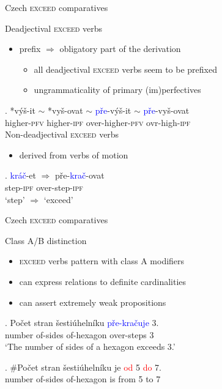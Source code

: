 \documentclass[12pt]{beamer}
\begin{document}
\begin{frame}{Czech \textsc{exceed} comparatives}

Deadjectival \textsc{exceed} verbs

\begin{itemize}
\item prefix $\Rightarrow$ obligatory part of the derivation
\begin{itemize}
\item all deadjectival \textsc{exceed} verbs seem to be prefixed
\item ungrammaticality of primary (im)perfectives
\end{itemize}
\end{itemize}

\exg. *{výš-it $\sim$} *{vyš-ovat $\sim$} {\textcolor{blue}{pře}-výš-it $\sim$} \textcolor{blue}{pře}-vyš-ovat\\
higher-\textsc{pfv} higher-\textsc{ipf} over-higher-\textsc{pfv} ovr-high-\textsc{ipf}\\

Non-deadjectival \textsc{exceed} verbs

\begin{itemize}
\item derived from verbs of motion %
\end{itemize}

\exg. {\textcolor{blue}{kráč}-et $\Rightarrow$} pře-\textcolor{blue}{krač}-ovat\\
step-\textsc{ipf} over-step-\textsc{ipf}\\
`step' $\Rightarrow$ `exceed'

\end{frame}

\begin{frame}{Czech \textsc{exceed} comparatives}

Class A/B distinction

\begin{itemize}
\item \textsc{exceed} verbs pattern with class A modifiers
\item can express relations to definite cardinalities
\item can assert extremely weak propositions
\end{itemize}

\exg. Počet stran šestiúhelníku \textcolor{blue}{pře-kračuje} 3.\\
number of-sides of-hexagon over-steps 3\\
`The number of sides of a hexagon exceeds 3.'

\exg. \#Počet stran šestiúhelníku je \textcolor{red}{od} 5 \textcolor{red}{do} 7.\\
number of-sides of-hexagon is from 5 to 7\\

\end{frame}
\end{document}
